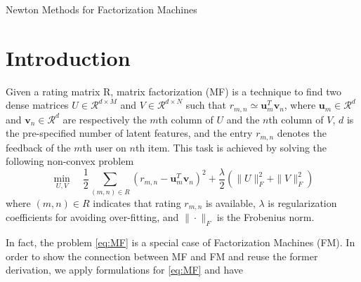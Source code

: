 \documentclass[11pt,twoside]{article}
\newcommand{\bsym}[1]{\ensuremath{\boldsymbol{#1}}}
\newcommand{\bu}{\ensuremath{\bsym{u}}}
\newcommand{\bv}{\ensuremath{\bsym{v}}}
\newcommand{\bbr}{\ensuremath{\mathcal R}}
\begin{document}
\begin{center}
    {\Large Newton Methods for Factorization Machines}
\end{center}


\section{Introduction}
Given a rating matrix R,  matrix factorization (MF) is a technique to find two dense matrices $U \in \bbr^{d \times M}$ and $V \in \bbr^{d \times N}$ such that $r_{m,n} \simeq \bu_m^T\bv_n$, where $\bu_m \in \bbr^d$ and $\bv_n \in \bbr^d$ are respectively the $m$th column of $U$ and the $n$th column of $V$, $d$ is the pre-speciﬁed number of latent features, and the entry $r_{m,n}$ denotes the feedback of the $m$th user on $n$th item.  This task is achieved by solving the following non-convex problem
\begin{equation}
    \min_{U,V} \quad \frac{1}{2}\sum_{(m, n) \in R}  (r_{m,n} - \bu_m^T \bv_n)^2+
    \frac{\lambda}{2} (\|U\|^2_F + \|V\|^2_F	)
    \label{eq:MF}
\end{equation}
where $(m, n) \in R$ indicates that rating $r_{m,n}$ is available, $\lambda$ is regularization coeﬃcients for avoiding over-ﬁtting, and $\|\cdot\|_F$ is the Frobenius norm.

In fact, the problem \eqref{eq:MF} is a special case of Factorization Machines (FM). In order to show the connection between MF and FM and reuse the former derivation, we apply formulations for \eqref{eq:MF} and have
\end{document}
